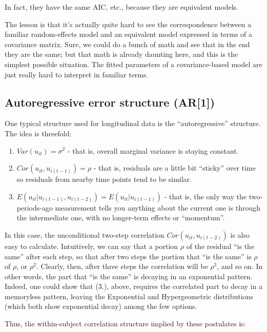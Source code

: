 \documentclass[
  letterpaper,
  DIV=11,
  numbers=noendperiod]{scrreprt}
\providecommand{\tightlist}{%
  \setlength{\itemsep}{0pt}\setlength{\parskip}{0pt}}\usepackage{longtable,booktabs,array}
\begin{document}
In fact, they have the same AIC, etc., because they are equivalent
models.

The lesson is that it's actually quite hard to see the correspondence
between a familiar random-effects model and an equivalent model
expressed in terms of a covariance matrix. Sure, we could do a bunch of
math and see that in the end they are the same; but that math is already
daunting here, and this is the simplest possible situation. The fitted
parameters of a covariance-based model are just really hard to interpret
in familiar terms.

\subsection{Autoregressive error structure
(AR{[}1{]})}\label{autoregressive-error-structure-ar1}

One typical structure used for longitudinal data is the
``autoregressive'' structure. The idea is threefold:

\begin{enumerate}
\def\labelenumi{\arabic{enumi}.}
\tightlist
\item
  \(Var(u_{it}) = \sigma^2\) - that is, overall marginal variance is
  staying constant.
\item
  \(Cor(u_{it},u_{i(t-1)}) = \rho\) - that is, residuals are a little
  bit ``sticky'' over time so residuals from nearby time points tend to
  be similar.
\item
  \(E(u_{it}|u_{i(t-1)},u_{i(t-2)}) = E(u_{it}|u_{i(t-1)})\) - that is,
  the only way the two-periods-ago measurement tells you anything about
  the current one is through the intermediate one, with no longer-term
  effects or ``momentum''.
\end{enumerate}

In this case, the unconditional two-step correlation
\(Cor(u_{it},u_{i(t-2)})\) is also easy to calculate. Intuitively, we
can say that a portion \(\rho\) of the residual ``is the same'' after
each step, so that after two steps the portion that ``is the same'' is
\(\rho\) of \(\rho\), or \(\rho^2\). Clearly, then, after three steps
the correlation will be \(\rho^3\), and so on. In other words, the part
that ``is the same'' is decaying in an exponential pattern. Indeed, one
could show that (3.), above, requires the correlated part to decay in a
memoryless pattern, leaving the Exponential and Hypergeometric
distributions (which both show exponential decay) among the few options.

Thus, the within-subject correlation structure implied by these
postulates is:
\end{document}

